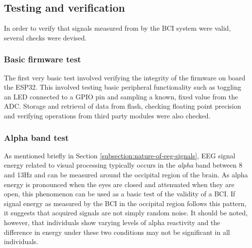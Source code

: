 \subsection{Testing and verification}
\label{subsection:testing-verification-method-c4}
In order to verify that signals measured from by the BCI system were valid, several checks were devised. 

\subsubsection{Basic firmware test}
The first very basic test involved verifying the integrity of the firmware on board the ESP32. This involved testing basic peripheral functionality such as toggling an LED connected to a GPIO pin and sampling a known, fixed value from the ADC. Storage and retrieval of data from flash, checking floating point precision and verifying operations from third party modules were also checked. 

\subsubsection{Alpha band test}
As mentioned briefly in Section \ref{subsection:nature-of-eeg-signals}, EEG signal energy related to visual processing typically occurs in the \textit{alpha} band between 8 and 13Hz and can be measured around the occipital region of the brain. As alpha energy is pronounced when the eyes are closed and attenuated when they are open, this phenomenon can be used as a basic test of the validity of a BCI. If signal energy as measured by the BCI in the occipital region follows this pattern, it suggests that acquired signals are not simply random noise. It should be noted, however, that individuals show varying levels of alpha reactivity and the difference in energy under these two conditions may not be significant in all individuals. 

